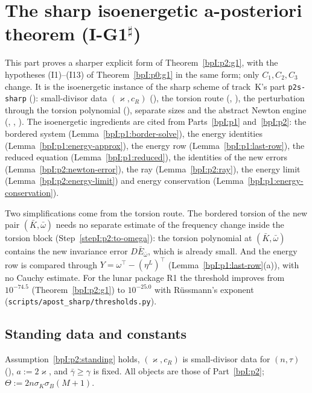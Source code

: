\sloppy
\section{The sharp isoenergetic a-posteriori theorem (I-G1$^\sharp$)}\label{bpI:p2s}

This part proves a sharper explicit form of Theorem~\ref{bpI:p2:g1}, with the hypotheses (I1)--(I13) of
Theorem~\ref{bpI:p0:g1} in the same form; only $C_1,C_2,C_3$ change. It is the isoenergetic instance of the sharp scheme of
track~K's part \texttt{p2s-sharp} (): small-divisor data $(\varkappa,c_R)$ (), the torsion route
(, ), the perturbation through the torsion polynomial
(), separate sizes and the abstract Newton engine (, ,
). The isoenergetic ingredients are cited from Parts~\ref{bpI:p1} and~\ref{bpI:p2}: the bordered system
(Lemma~\ref{bpI:p1:border-solve}), the energy identities (Lemma~\ref{bpI:p1:energy-approx}), the energy row
(Lemma~\ref{bpI:p1:last-row}), the reduced equation (Lemma~\ref{bpI:p1:reduced}), the identities of the new errors
(Lemma~\ref{bpI:p2:newton-error}), the ray (Lemma~\ref{bpI:p2:ray}), the energy limit (Lemma~\ref{bpI:p2:energy-limit}) and energy
conservation (Lemma~\ref{bpI:p1:energy-conservation}).

Two simplifications come from the torsion route. The bordered torsion of the new pair $(\bar K,\bar\omega)$ needs no separate estimate
of the frequency change inside the torsion block (Step~\ref{stepI:p2:to-omega}): the torsion polynomial at $(\bar K,\bar\omega)$ contains
the new invariance error $D\bar E_{\bar\omega}$, which is already small. And the energy row is compared through
$Y=\omega^\top-(\eta^L)^\top$ (Lemma~\ref{bpI:p1:last-row}(a)), with no Cauchy estimate. For the lunar package R1 the threshold improves
from $10^{-74.5}$ (Theorem~\ref{bpI:p2:g1}) to $10^{-25.0}$ with R\"ussmann's exponent (\texttt{scripts/apost\_sharp/thresholds.py}).

\subsection{Standing data and constants}\label{bpI:p2s:sec-setting}

\begin{assumption}\label{bpI:p2s:standing}
Assumption~\ref{bpI:p2:standing} holds, $(\varkappa,c_R)$ is small-divisor data for $(n,\tau)$ (), $a:=2\varkappa$,
and $\bar\gamma\ge\gamma$ is fixed. All objects are those of Part~\ref{bpI:p2}; $\Theta:=2n\sigma_K\sigma_B(M+1)$.
\end{assumption}

